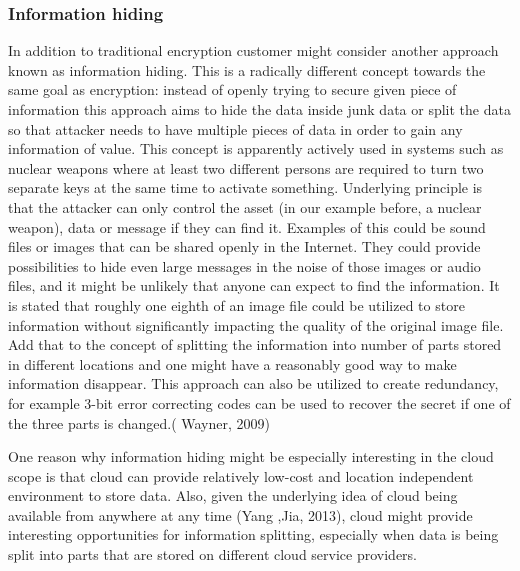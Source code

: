 \documentclass{article}
\begin{document}
\subsubsection{Information hiding}
In addition to traditional encryption customer might consider another approach known as information hiding. This is a radically different concept towards the same goal as encryption: instead of openly trying to secure given piece of information this approach aims to hide the data inside junk data or split the data so that attacker needs to have multiple pieces of data in order to gain any information of value. This concept is apparently actively used in systems such as nuclear weapons where at least two different persons are required to turn two separate keys at the same time to activate something. Underlying principle is that the attacker can only control the asset (in our example before, a nuclear weapon), data or message if they can find it. Examples of this could be sound files or images that can be shared openly in the Internet. They could provide possibilities to hide even large messages in the noise of those images or audio files, and it might be unlikely that anyone can expect to find the information. It is stated that roughly one eighth of an image file could be utilized to store information without significantly impacting the quality of the original image file. Add that to the concept of splitting the information into number of parts stored in different locations and one might have a reasonably good way to make information disappear. This approach can also be utilized to create redundancy, for example 3-bit error correcting codes can be used to recover the secret if one of the three parts is changed.( Wayner, 2009)
\par
One reason why information hiding might be especially interesting in the cloud scope is that cloud can provide relatively low-cost and location independent environment to store data. Also, given the underlying idea of cloud being available from anywhere at any time (Yang ,Jia, 2013), cloud might provide interesting opportunities for information splitting, especially when data is being split into parts that are stored on different cloud service providers.
\end{document}
